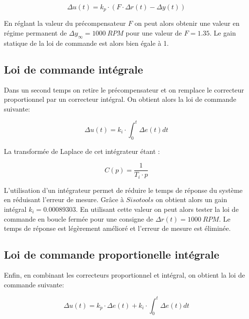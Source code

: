 \documentclass[12pt]{report}
\begin{document}
\vspace{0.2cm}
\begin{equation}
  \Delta u(t) = k_p \cdot (F \cdot \Delta r(t) - \Delta y(t))
\end{equation}
\vspace{0.2cm}

En réglant la valeur du précompensateur $F$ on peut alors obtenir une valeur en régime
permanent de $\Delta y_{\infty} = 1000 ~ RPM$ pour une valeur de $F = 1.35$. Le gain
statique de la loi de commande est alors bien égale à 1.

\newpage

\subsection{Loi de commande intégrale}

Dans un second temps on retire le précompensateur et on remplace le correcteur proportionnel par un correcteur intégral.
On obtient alors la loi de commande suivante: 

\vspace{0.2cm}
\begin{equation}
  \Delta u(t) = k_i \cdot \int_{0}^{t} \Delta e(t) dt
\end{equation}

La transformée de Laplace de cet intégrateur étant :

\vspace{0.2cm}
\begin{equation}
  C(p) = \frac{1}{T_i \cdot p}
\end{equation}


L'utilisation d'un intégrateur permet de réduire le temps de réponse du système
en réduisant l'erreur de mesure. Grâce à $Sisotools$ on obtient alors un gain intégral
$k_i = 0.00089303$. En utilisant cette valeur on peut alors tester la loi de commande
en boucle fermée pour une consigne de $\Delta r(t) = 1000 ~ RPM$. Le temps de réponse
est légèrement amélioré et l'erreur de mesure est éliminée.

\subsection{Loi de commande proportionelle intégrale}

Enfin, en combinant les correcteurs proportionnel et intégral, on obtient la loi de 
commande suivante:

\vspace{0.2cm}
\begin{equation}
  \Delta u(t) = k_p \cdot \Delta e(t) + k_i \cdot \int_{0}^{t} \Delta e(t) dt
\end{equation}
\end{document}
